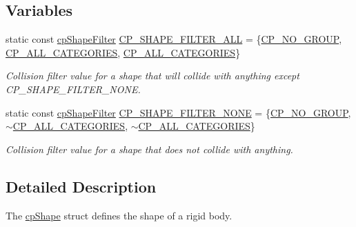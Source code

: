 \subsection*{Variables}
\begin{DoxyCompactItemize}
\item 
\hypertarget{group__cp_shape_gaef9ee63420c81af95358f210ea29f7e4}{}static const \hyperlink{structcp_shape_filter}{cp\+Shape\+Filter} \hyperlink{group__cp_shape_gaef9ee63420c81af95358f210ea29f7e4}{C\+P\+\_\+\+S\+H\+A\+P\+E\+\_\+\+F\+I\+L\+T\+E\+R\+\_\+\+A\+L\+L} = \{\hyperlink{group__basic_types_gabd2870d269e0288b26b045c81a07acc8}{C\+P\+\_\+\+N\+O\+\_\+\+G\+R\+O\+U\+P}, \hyperlink{group__basic_types_ga591693fbd3ed24f3365ef7accf349d4f}{C\+P\+\_\+\+A\+L\+L\+\_\+\+C\+A\+T\+E\+G\+O\+R\+I\+E\+S}, \hyperlink{group__basic_types_ga591693fbd3ed24f3365ef7accf349d4f}{C\+P\+\_\+\+A\+L\+L\+\_\+\+C\+A\+T\+E\+G\+O\+R\+I\+E\+S}\}\label{group__cp_shape_gaef9ee63420c81af95358f210ea29f7e4}

\begin{DoxyCompactList}\small\item\em Collision filter value for a shape that will collide with anything except C\+P\+\_\+\+S\+H\+A\+P\+E\+\_\+\+F\+I\+L\+T\+E\+R\+\_\+\+N\+O\+N\+E. \end{DoxyCompactList}\item 
\hypertarget{group__cp_shape_ga9797bc5baffd39b2d9b8839cc0e1a271}{}static const \hyperlink{structcp_shape_filter}{cp\+Shape\+Filter} \hyperlink{group__cp_shape_ga9797bc5baffd39b2d9b8839cc0e1a271}{C\+P\+\_\+\+S\+H\+A\+P\+E\+\_\+\+F\+I\+L\+T\+E\+R\+\_\+\+N\+O\+N\+E} = \{\hyperlink{group__basic_types_gabd2870d269e0288b26b045c81a07acc8}{C\+P\+\_\+\+N\+O\+\_\+\+G\+R\+O\+U\+P}, $\sim$\hyperlink{group__basic_types_ga591693fbd3ed24f3365ef7accf349d4f}{C\+P\+\_\+\+A\+L\+L\+\_\+\+C\+A\+T\+E\+G\+O\+R\+I\+E\+S}, $\sim$\hyperlink{group__basic_types_ga591693fbd3ed24f3365ef7accf349d4f}{C\+P\+\_\+\+A\+L\+L\+\_\+\+C\+A\+T\+E\+G\+O\+R\+I\+E\+S}\}\label{group__cp_shape_ga9797bc5baffd39b2d9b8839cc0e1a271}

\begin{DoxyCompactList}\small\item\em Collision filter value for a shape that does not collide with anything. \end{DoxyCompactList}\end{DoxyCompactItemize}


\subsection{Detailed Description}
The \hyperlink{structcp_shape}{cp\+Shape} struct defines the shape of a rigid body. 

